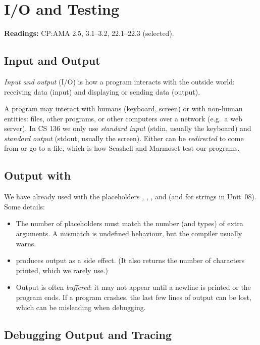 \chapter{I/O and Testing}

\textbf{Readings:} CP:AMA 2.5, 3.1--3.2, 22.1--22.3 (selected).

\section{Input and Output}

\begin{definition}
\emph{Input and output} (I/O) is how a program interacts with the outside world: receiving data
(input) and displaying or sending data (output).
\end{definition}

A program may interact with humans (keyboard, screen) or with non-human entities: files,
other programs, or other computers over a network (e.g.\ a web server). In CS 136 we only use
\emph{standard input} (stdin, usually the keyboard) and \emph{standard output} (stdout, usually
the screen). Either can be \emph{redirected} to come from or go to a file, which is how Seashell
and Marmoset test our programs.

\section{Output with }

We have already used  with the placeholders , , ,
 and  (and  for strings in Unit~08). Some details:
\begin{itemize}
  \item The number of placeholders must match the number (and types) of extra arguments.
    A mismatch is undefined behaviour, but the compiler usually warns.
  \item {} produces output as a side effect. (It also returns the number of
    characters printed, which we rarely use.)
  \item Output is often \emph{buffered}: it may not appear until a newline is printed or the
    program ends. If a program crashes, the last few lines of output can be lost, which can be
    misleading when debugging.
\end{itemize}

\section{Debugging Output and Tracing}

